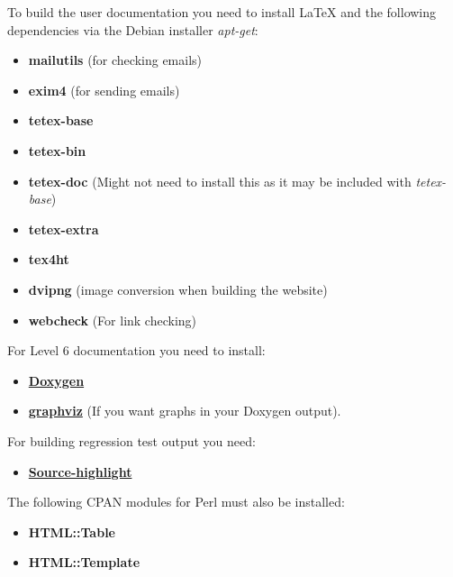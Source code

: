 \documentclass[12pt]{article}
\begin{document}
To build the user documentation you need to install \LaTeX\,\,and the following dependencies via the Debian installer {\it apt-get}:
\begin{itemize}
\item[]{\bf mailutils} (for checking emails)
\item[]{\bf exim4} (for sending emails)
\item[]{\bf tetex-base}
\item[]{\bf tetex-bin}
\item[]{\bf tetex-doc} (Might not need to install this as it may be included with {\it tetex-base})
\item[]{\bf tetex-extra}
\item[]{\bf tex4ht}
\item[]{\bf dvipng} (image conversion when building the website)
\item[]{\bf webcheck} (For link checking) 
\end{itemize}
For Level 6 documentation you need to install:
\begin{itemize}
   \item[]\href{http://www.doxygen.org/}{\bf Doxygen}
   \item[]\href{http://www.graphviz.org/Download.php}{\bf graphviz} (If you want graphs in your Doxygen output).
\end{itemize}
For building regression test output you need:
\begin{itemize}
   \item[]\href{http://www.gnu.org/software/src-highlite/}{\bf Source-highlight} 
\end{itemize}
The following CPAN modules for Perl must also be installed:
\begin{itemize}
   \item[]{\bf HTML::Table}
   \item[]{\bf HTML::Template}
\end{itemize}
\end{document}
